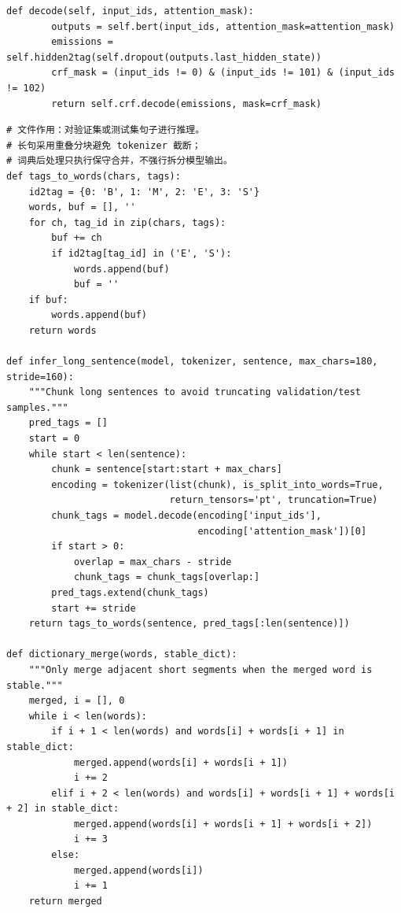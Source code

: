 \documentclass[12pt,a4paper,UTF8]{ctexart}
\newcommand{\xiaosi}{\fontsize{12pt}{18pt}\selectfont}
\newenvironment{reportbody}{\songti\xiaosi\onehalfspacing\sloppy}{}
\begin{document}
\begin{reportbody}
\begin{lstlisting}[style=appendixcode, caption={model\_bert.py：RoBERTa+CRF 中文分词模型}]
    def decode(self, input_ids, attention_mask):
        outputs = self.bert(input_ids, attention_mask=attention_mask)
        emissions = self.hidden2tag(self.dropout(outputs.last_hidden_state))
        crf_mask = (input_ids != 0) & (input_ids != 101) & (input_ids != 102)
        return self.crf.decode(emissions, mask=crf_mask)
\end{lstlisting}

\begin{lstlisting}[style=appendixcode, caption={infer\_bert.py：长句推理与稳定词典后处理}]
# 文件作用：对验证集或测试集句子进行推理。
# 长句采用重叠分块避免 tokenizer 截断；
# 词典后处理只执行保守合并，不强行拆分模型输出。
def tags_to_words(chars, tags):
    id2tag = {0: 'B', 1: 'M', 2: 'E', 3: 'S'}
    words, buf = [], ''
    for ch, tag_id in zip(chars, tags):
        buf += ch
        if id2tag[tag_id] in ('E', 'S'):
            words.append(buf)
            buf = ''
    if buf:
        words.append(buf)
    return words

def infer_long_sentence(model, tokenizer, sentence, max_chars=180, stride=160):
    """Chunk long sentences to avoid truncating validation/test samples."""
    pred_tags = []
    start = 0
    while start < len(sentence):
        chunk = sentence[start:start + max_chars]
        encoding = tokenizer(list(chunk), is_split_into_words=True,
                             return_tensors='pt', truncation=True)
        chunk_tags = model.decode(encoding['input_ids'],
                                  encoding['attention_mask'])[0]
        if start > 0:
            overlap = max_chars - stride
            chunk_tags = chunk_tags[overlap:]
        pred_tags.extend(chunk_tags)
        start += stride
    return tags_to_words(sentence, pred_tags[:len(sentence)])

def dictionary_merge(words, stable_dict):
    """Only merge adjacent short segments when the merged word is stable."""
    merged, i = [], 0
    while i < len(words):
        if i + 1 < len(words) and words[i] + words[i + 1] in stable_dict:
            merged.append(words[i] + words[i + 1])
            i += 2
        elif i + 2 < len(words) and words[i] + words[i + 1] + words[i + 2] in stable_dict:
            merged.append(words[i] + words[i + 1] + words[i + 2])
            i += 3
        else:
            merged.append(words[i])
            i += 1
    return merged
\end{lstlisting}


\end{reportbody}
\end{document}
